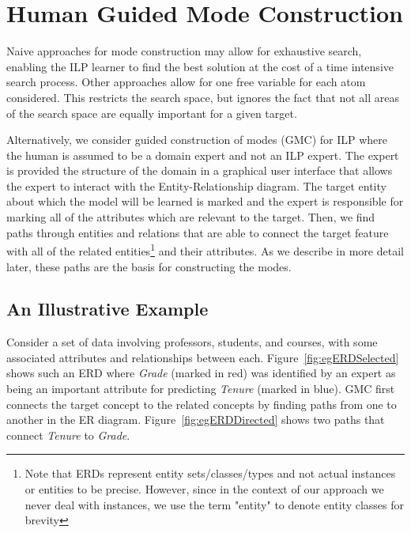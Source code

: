 \documentclass[sigconf]{acmart}
\begin{document}
\section{Human Guided Mode Construction}

Naive approaches for mode construction may allow for exhaustive search, enabling the ILP learner to find the best solution at the cost of a time intensive search process. Other approaches allow for one free variable for each atom considered. This restricts the search space, but ignores the fact that not all areas of the search space are equally important for a given target.

Alternatively, we consider guided construction of modes (\textsc{GMC}) for ILP where the human is assumed to be a domain expert and not an ILP expert. The expert is provided the structure of the domain in a graphical user interface that allows the expert to interact with the Entity-Relationship diagram. The target entity about which the model will be learned is marked and the expert is responsible for marking all of the attributes which are relevant to the target. Then, we find paths through entities and relations that are able to connect the target feature with all of the related entities\footnote{Note that ERDs represent entity sets/classes/types and not actual instances or entities to be precise. However, since in the context of our approach we never deal with instances, we use the term "entity" to denote entity classes for brevity} and their attributes. As we describe in more detail later, these paths are the basis for constructing the modes.

\subsection{An Illustrative Example}

Consider a set of data involving professors, students, and courses, with some associated attributes and relationships between each. Figure~\ref{fig:egERDSelected} shows such an ERD where \textit{Grade} (marked in red) was identified by an expert as being an important attribute for predicting \textit{Tenure} (marked in blue).
\textsc{GMC} first connects the target concept to the related concepts by finding paths from one to another in the ER diagram. Figure~\ref{fig:egERDDirected} shows two paths that connect \textit{Tenure} to \textit{Grade}.
\end{document}
